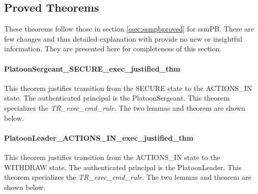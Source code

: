 \documentclass[../../main/main.tex]{subfiles}
\begin{document}
\HOLConductORPDefDefinitionssecAuthorizationXXdef

\HOLConductORPDefDefinitionssecHelperXXdef


\subsection{Proved Theorems}
These theorems follow those in section \ref{ssec:ssmpbproved} for ssmPB.  There are few changes and thus detailed explanation with provide no new or insightful information.  They are presented here for completeness of this section.

\paragraph*{PlatoonSergeant_SECURE_exec_justified_thm}
This theorem justifies transition from the SECURE state to the ACTIONS_IN  state.  The authenticated principal is the PlatoonSergeant.  This theorem specializes the \textit{TR_exec_cmd_rule}.  The two lemmas and theorem are shown below.

\HOLssmConductORPTheoremsPlatoonSergeantXXSECUREXXexecXXlemma
{}\HOLssmConductORPTheoremsPlatoonSergeantXXSECUREXXexecXXjustifiedXXlemma
\HOLssmConductORPTheoremsPlatoonSergeantXXSECUREXXexecXXjustifiedXXthm

\paragraph*{PlatoonLeader_ACTIONS_IN_exec_justified_thm}
This theorem justifies transition from the ACTIONS_IN state to the WITHDRAW state.  The authenticated principal is the PlatoonLeader.  This theorem specializes the \textit{TR_exec_cmd_rule}.  The two lemmas and theorem are shown below.

\HOLssmConductORPTheoremsPlatoonLeaderXXACTIONSXXINXXexecXXlemma
\HOLssmConductORPTheoremsPlatoonLeaderXXACTIONSXXINXXexecXXjustifiedXXlemma
\HOLssmConductORPTheoremsPlatoonLeaderXXACTIONSXXINXXexecXXjustifiedXXthm
\end{document}
